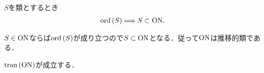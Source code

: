 	\begin{screen}
		\begin{thm}
			$S$を類とするとき
			\begin{align}
				\operatorname*{ord} \left(S\right) \Longrightarrow S \subset \mathrm{ON}.
			\end{align}
		\end{thm}
	\end{screen}
	
	$S \in \mathrm{ON}$ならば$\operatorname*{ord} \left(S\right)$が成り立つので$S \subset \mathrm{ON}$となる．従って$\mathrm{ON}$は推移的類である．
	
	\begin{screen}
		\begin{thm}[順序数全体は推移的]\label{thm:On_is_transitive}
			$\operatorname*{tran} \left(\mathrm{ON}\right)$が成立する．
		\end{thm}
	\end{screen}
	
